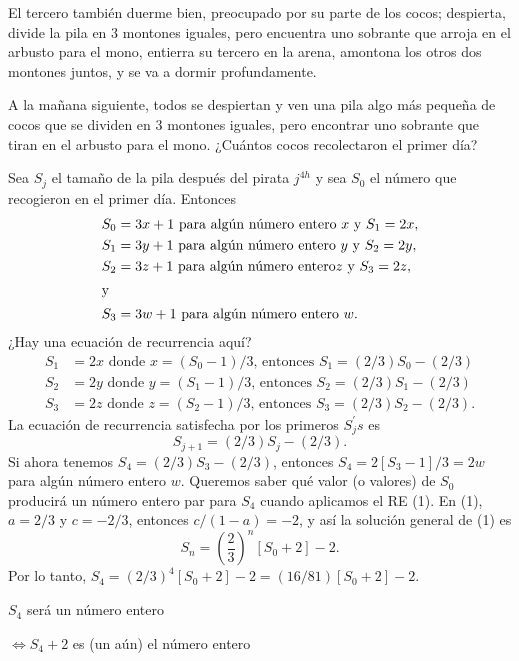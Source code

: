 El tercero también duerme bien, preocupado por su parte de los cocos; despierta, divide la pila en 3 montones iguales, pero encuentra uno sobrante que arroja en el arbusto para el mono, entierra su tercero en la arena, amontona los otros dos montones juntos, y se va a dormir profundamente.

A la mañana siguiente, todos se despiertan y ven una pila algo más pequeña de cocos que se dividen en 3 montones iguales, pero encontrar uno sobrante que tiran en el arbusto para el mono. ¿Cuántos cocos recolectaron el primer día?

Sea $S_{j}$ el tamaño de la pila después del pirata $j^{4h}$ y sea $S_{0}$ el número que recogieron en el primer día. Entonces
\begin{align*}
	S_{0}&=3x+1\text{ para algún número entero }x\text{ y }S_1=2x,\\
	S_{1}&= 3y+1\text{ para algún número entero }y\text{ y }S_2=2y,\\
	S_{2}&=3z+1\text{ para algún número entero}z\text{ y }S_3=2z,\\
	\intertext{y}
	S_{3}&=3w+1\text{ para algún número entero }w.
\end{align*}
¿Hay una ecuación de recurrencia aquí?
\begin{align*}
	S_{1}&=2x\text{ donde }x=(S_{0}-1)/3\text{, entonces }S_{1}=(2/3)S_0-(2/3)\\
	S_{2}&=2y\text{ donde }y=(S_{1}-1)/3\text{, entonces }S_{2}=(2/3)S_1-(2/3)\\
	S_{3}&=2z\text{ donde }z=(S_{2}-1)/3\text{, entonces }S_{3}=(2/3)S_2-(2/3).
\end{align*}
La ecuación de recurrencia satisfecha por los primeros $S_{j}^{\prime}s$ es
\begin{equation}
	S_{j+1}=(2/3)S_{j}-(2/3).
\end{equation}
Si ahora tenemos $S_{4}=(2/3)S_{3}-(2/3)$, entonces $S_{4}=2[S_{3}-1]/3=2w$ para algún número entero $w$. Queremos saber qué valor (o valores) de $S_0$ producirá un número entero par para $S_4$ cuando aplicamos el RE (1). En (1), $a=2/3$ y $c=-2/3$, entonces $c/(1-a) = -2$, y así la solución general de (1) es
\begin{equation*}
	S_{n}={\left(\frac{2}{3}\right)}^{n}\left[S_{0}+2\right]-2.
\end{equation*}
Por lo tanto, $S_{4}=(2/3)^{4}[S_0+2]-2=(16/81)\left[S_0 + 2\right]-2$.

$S_{4}$ será un número entero

$\Leftrightarrow S_{4}+2$ es (un aún) el número entero

